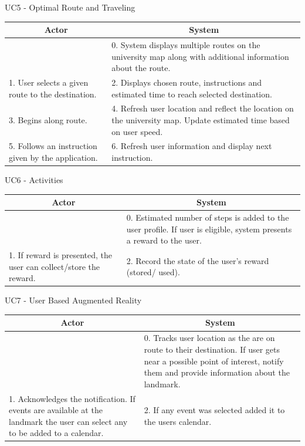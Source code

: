 \documentclass[a4paper, 12pt, one column, aas_macros]{article}
\begin{document}
\hfill \break \hfill \break \hfill \break
  UC5 - Optimal Route and Traveling \hfill \break
  \begin{tabular}{ |p{5.5cm}|p{5.5cm}| }
    \hline
    \multicolumn{1}{|c|}{Actor} & \multicolumn{1}{c|}{System} \\ \hline
     &0. System displays multiple routes on the university map along with additional information about the route.\\ \hline
     1. User selects a given route to the destination. &2. Displays chosen route, instructions and estimated time to reach selected destination.\\ \hline
     3. Begins along route.&4. Refresh user location and reflect the location on the university map. Update estimated time based on user speed.\\ \hline
     5. Follows an instruction given by the application.&6. Refresh user information and display next instruction.\\ \hline
  \end{tabular}
\hfill \break \hfill \break \hfill \break
  UC6 - Activities \hfill \break
  \begin{tabular}{ |p{5.5cm}|p{5.5cm}| }
    \hline
    \multicolumn{1}{|c|}{Actor} & \multicolumn{1}{c|}{System} \\ \hline
     &0. Estimated number of steps is added to the user profile. If user is eligible, system presents a reward to the user.\\ \hline
    1. If reward is presented, the user can collect/store the reward.&2. Record the state of the user’s reward (stored/ used).\\ \hline
  \end{tabular}
\hfill \break \hfill \break \hfill \break
\newpage
  UC7 - User Based Augmented Reality \hfill \break
  \begin{tabular}{ |p{5.5cm}|p{5.5cm}| }
    \hline
    \multicolumn{1}{|c|}{Actor} & \multicolumn{1}{c|}{System} \\ \hline
     &0. Tracks user location as the are on route to their destination. If user gets near a possible point of interest, notify them and provide information about the landmark.\\ \hline
     1. Acknowledges the notification. If events are available at the landmark the user can select any to be added to a calendar. &2. If any event was selected added it to the users calendar.\\ \hline
  \end{tabular}
\hfill \break \hfill \break \hfill \break
\end{document}
